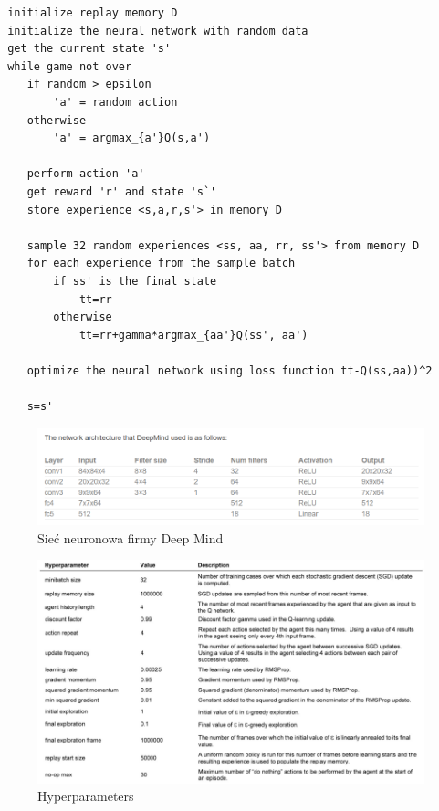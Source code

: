 \documentclass[12pt]{article}
\begin{document}
\begin{lstlisting}
 initialize replay memory D
 initialize the neural network with random data
 get the current state 's'
 while game not over
 	if random > epsilon 
 		'a' = random action
 	otherwise
 		'a' = argmax_{a'}Q(s,a')

	perform action 'a'
	get reward 'r' and state 's`'
	store experience <s,a,r,s'> in memory D
	
	sample 32 random experiences <ss, aa, rr, ss'> from memory D
	for each experience from the sample batch
		if ss' is the final state 
			tt=rr
		otherwise
			tt=rr+gamma*argmax_{aa'}Q(ss', aa')
	
	optimize the neural network using loss function tt-Q(ss,aa))^2
	
	s=s'
\end{lstlisting}



\begin{figure}[H]
\centering \includegraphics[scale=0.7]{deep_mind_architecture.PNG}
\caption{Sieć neuronowa firmy Deep Mind}
\label{simple1}
\end{figure}


\begin{figure}[H]
\centering \includegraphics[scale=0.5]{hyperparameters.PNG}
\caption{Hyperparameters}
\label{simple1}
\end{figure}
\end{document}
